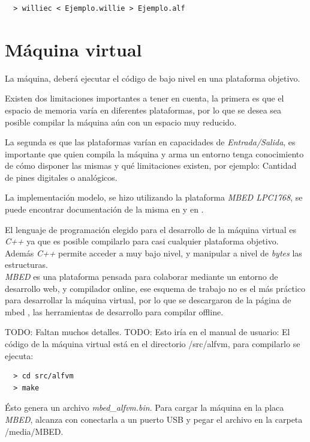   \begin{verbatim}
  > williec < Ejemplo.willie > Ejemplo.alf
  \end{verbatim}

\section{Máquina virtual}

  La máquina, deberá ejecutar el código de bajo nivel en una plataforma
  objetivo.

  Existen dos limitaciones importantes a tener en cuenta, la primera es que
el espacio de memoria varía en diferentes plataformas, por lo que se desea
sea posible compilar la máquina aún con un espacio muy reducido.

  La segunda es que las plataformas varían en capacidades
de \textit{Entrada/Salida}, es importante que quien compila la máquina y
arma un entorno tenga conocimiento de cómo disponer las mismas y qué
limitaciones existen, por ejemplo: Cantidad de pines digitales o analógicos.

  La implementación modelo, se hizo utilizando
  la plataforma \textit{MBED LPC1768},
se puede encontrar documentación de la misma en \cite{mbed-LPC1768} 
y en \cite{mbed}.

  El lenguaje de programación elegido para el desarrollo de la máquina virtual
es \textit{C++} ya que es posible compilarlo para casi cualquier plataforma
objetivo.
  Además \textit{C++} permite acceder a muy bajo nivel, y manipular a
nivel de \emph{bytes} las estructuras.\\

  \textit{MBED} es una plataforma pensada para colaborar mediante
un entorno de desarrollo web, y compilador online, ese esquema de 
trabajo no es el más práctico para desarrollar la máquina virtual, por
lo que se descargaron de la página de mbed \cite{mbeddev}, las herramientas
de desarrollo para compilar offline.

TODO: Faltan muchos detalles.
TODO: Esto iría en el manual de usuario:
  El código de la máquina virtual está en el directorio
  /src/alfvm, para compilarlo se ejecuta:

\begin{verbatim}
  > cd src/alfvm
  > make
\end{verbatim}

  Ésto genera un archivo \emph{mbed\_alfvm.bin}.
  Para cargar la máquina en la placa \textit{MBED}, alcanza con conectarla
a un puerto USB y pegar el archivo en la carpeta /media/MBED.


